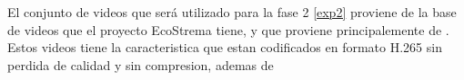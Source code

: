% 
El conjunto de videos que será utilizado para la fase 2 \ref{exp2} proviene de la base de videos que el proyecto EcoStrema tiene, y que proviene principalemente de \cite{cable-labs}. Estos videos tiene la caracteristica que estan codificados en formato H.265 sin perdida de calidad y sin compresion, ademas de 